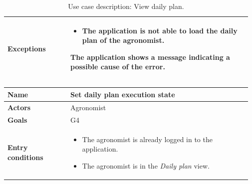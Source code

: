 \begin{table}[H]
\begin{tabular}{@{}p{0.25\linewidth} p{0.72\linewidth}@{}}
		\textbf{Exceptions}         & 
	    \begin{itemize}[leftmargin=.4cm,noitemsep,topsep=0pt,before=\vspace{-3mm}]
		   \item The application is not able to load the daily plan of the agronomist.
		\end{itemize}
		The application shows a message indicating a possible cause of the error.
		\\\bottomrule
	\end{tabular}
	\caption{Use case description: View daily plan.} 
\end{table}

\begin{table}[H]
    \centering
	\begin{tabular}{@{}p{0.25\linewidth} p{0.72\linewidth}@{}}
		\toprule
		\textbf{Name}               & Set daily plan execution state \\
		\midrule
		\textbf{Actors}             & Agronomist\\
		\midrule
		\textbf{Goals}              & G4 \\
		\midrule
		
		\textbf{Entry conditions}   & \begin{itemize}[leftmargin=.4cm,noitemsep,topsep=0pt,before=\vspace{-3mm},after=\vspace{-4mm}]
		    \item The agronomist is already logged in to the application.
		    \item The agronomist is in the \textit{Daily plan} view.
		\end{itemize}\\
		\midrule
		

\end{tabular}
\end{table}
